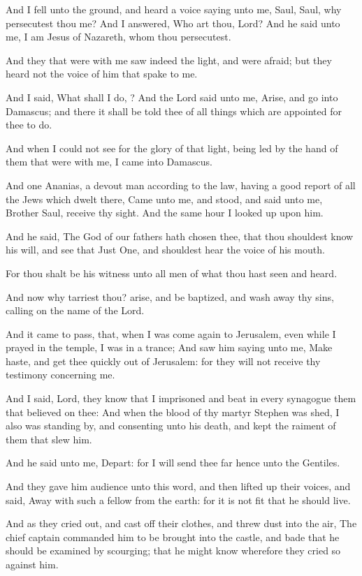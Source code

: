 \Verse And I fell unto the ground, and heard a voice saying unto me, Saul, Saul, why persecutest thou me?  \Verse And I answered, Who art thou, Lord? And he said unto me, I am Jesus of Nazareth, whom thou persecutest.

\Verse And they that were with me saw indeed the light, and were afraid; but they heard not the voice of him that spake to me.

\Verse And I said, What shall I do, \LORD? And the Lord said unto me, Arise, and go into Damascus; and there it shall be told thee of all things which are appointed for thee to do.

\Verse And when I could not see for the glory of that light, being led by the hand of them that were with me, I came into Damascus.

\Verse And one Ananias, a devout man according to the law, having a good report of all the Jews which dwelt there, \Verse Came unto me, and stood, and said unto me, Brother Saul, receive thy sight. And the same hour I looked up upon him.

\Verse And he said, The God of our fathers hath chosen thee, that thou shouldest know his will, and see that Just One, and shouldest hear the voice of his mouth.

\Verse For thou shalt be his witness unto all men of what thou hast seen and heard.

\Verse And now why tarriest thou? arise, and be baptized, and wash away thy sins, calling on the name of the Lord.

\Verse And it came to pass, that, when I was come again to Jerusalem, even while I prayed in the temple, I was in a trance; \Verse And saw him saying unto me, Make haste, and get thee quickly out of Jerusalem: for they will not receive thy testimony concerning me.

\Verse And I said, Lord, they know that I imprisoned and beat in every synagogue them that believed on thee: \Verse And when the blood of thy martyr Stephen was shed, I also was standing by, and consenting unto his death, and kept the raiment of them that slew him.

\Verse And he said unto me, Depart: for I will send thee far hence unto the Gentiles.

\Verse And they gave him audience unto this word, and then lifted up their voices, and said, Away with such a fellow from the earth: for it is not fit that he should live.

\Verse And as they cried out, and cast off their clothes, and threw dust into the air, \Verse The chief captain commanded him to be brought into the castle, and bade that he should be examined by scourging; that he might know wherefore they cried so against him.


